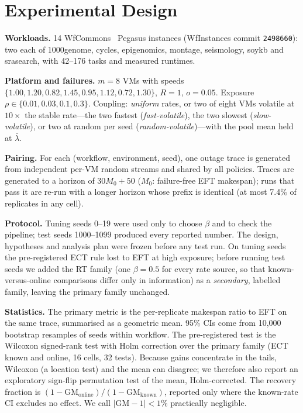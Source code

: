 \documentclass[conference]{IEEEtran}
\newcommand{\EFT}{\textsf{EFT}}
\newcommand{\ECT}{\textsf{ECT}}
\newcommand{\RT}{\textsf{RT}}
\begin{document}
\section{Experimental Design}
\textbf{Workloads.} 14 WfCommons~\cite{coleman2022wfcommons} Pegasus instances (WfInstances commit \texttt{2498660}):
two each of 1000genome, cycles, epigenomics, montage, seismology, soykb and srasearch, with 42--176 tasks and
measured runtimes.

\textbf{Platform and failures.} $m=8$ VMs with speeds $\{1.00, 1.20, 0.82, 1.45, 0.95, 1.12, 0.72, 1.30\}$,
$R=1$, $o=0.05$. Exposure $\rho \in \{0.01, 0.03, 0.1, 0.3\}$. Coupling: \emph{uniform} rates, or two of eight VMs
volatile at $10\times$ the stable rate---the two fastest (\emph{fast-volatile}), the two slowest
(\emph{slow-volatile}), or two at random per seed (\emph{random-volatile})---with the pool mean held at $\bar\lambda$.

\textbf{Pairing.} For each (workflow, environment, seed), one outage trace is generated from independent per-VM
random streams and shared by all policies. Traces are generated to a horizon of $30M_0+50$ ($M_0$: failure-free EFT
makespan); runs that pass it are re-run with a longer horizon whose prefix is identical (at most 7.4\% of
replicates in any cell).

\textbf{Protocol.} Tuning seeds 0--19 were used only to choose $\beta$ and to check the pipeline; test seeds
1000--1099 produced every reported number. The design, hypotheses and analysis plan were frozen before any test
run. On tuning seeds the pre-registered \ECT{} rule lost to \EFT{} at high exposure; before running test seeds we
added the \RT{} family (one $\beta=0.5$ for every rate source, so that known-versus-online comparisons differ only in
information) as a \emph{secondary}, labelled family, leaving the primary family unchanged.

\textbf{Statistics.} The primary metric is the per-replicate makespan ratio to \EFT{} on the same trace, summarised
as a geometric mean. 95\% CIs come from 10,000 bootstrap resamples of seeds within workflow. The pre-registered
test is the Wilcoxon signed-rank test with Holm correction over the primary family (\ECT{} known and online,
16 cells, 32 tests). Because gains concentrate in the tails, Wilcoxon (a location test) and the mean can disagree;
we therefore also report an exploratory sign-flip permutation test of the mean, Holm-corrected. The recovery
fraction is $(1-\mathrm{GM}_\text{online})/(1-\mathrm{GM}_\text{known})$, reported only where the known-rate CI
excludes no effect. We call $|\mathrm{GM}-1|<1\%$ practically negligible.
\end{document}
